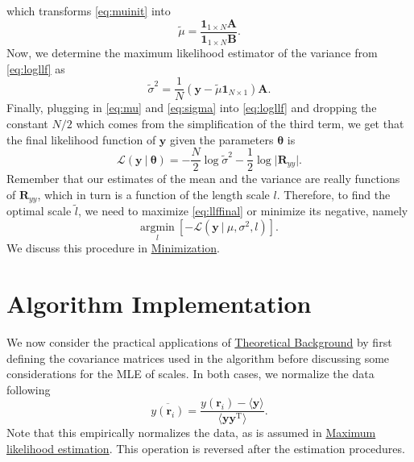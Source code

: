 \documentclass[12pt]{article}
\begin{document}
which transforms \eqref{eq:muinit} into
\begin{equation}
    \tilde{\mu} = \frac{\bm{1}_{1\times N}\bm{A}}{\bm{1}_{1\times N}\bm{B}}.
    \label{eq:mu}
\end{equation}
Now, we determine the maximum likelihood estimator of the variance from \eqref{eq:logllf} as
\begin{equation}
    \tilde{\sigma}^{2} = \frac{1}{N}(\bm{y} - \tilde{\mu}\bm{1}_{N\times 1})\bm{A}. 
    \label{eq:sigma}
\end{equation}
Finally, plugging in \eqref{eq:mu} and \eqref{eq:sigma} into \eqref{eq:logllf} and dropping the constant $N/2$ which comes from the simplification of the third term, we get that the final likelihood function of $\bm{y}$ given the parameters $\bm{\theta}$ is 
\begin{equation}
    \mathcal{L}(\bm{y} \: \lvert \: \bm{\theta}) = -\frac{N}{2}\log\tilde{\sigma}^{2} - \frac{1}{2}\log\lvert\bm{R}_{yy}\rvert.
    \label{eq:llffinal}
\end{equation}
Remember that our estimates of the mean and the variance are really functions of $\bm{R}_{yy}$, which in turn is a function of the length scale $l$. 
Therefore, to find the optimal scale $\tilde{l}$, we need to maximize \eqref{eq:llffinal} or minimize its negative, namely
\begin{equation}
	\underset{l}{\textrm{argmin}}\:\left[- \mathcal{L}\left(\bm{y} \: \lvert \: \mu, \sigma^{2}, l\right)\right].
	\label{eq:llf_min}
\end{equation}
We discuss this procedure in \hyperref[sec:minimization]{Minimization}.

\section*{Algorithm Implementation}

We now consider the practical applications of \hyperref[sec:theory]{Theoretical Background} by first defining the covariance matrices used in the algorithm before discussing some considerations for the MLE of scales.
In both cases, we normalize the data following
\begin{equation}
	\overline{y\left(\bm{r}_i\right)} = \frac{y\left(\bm{r}_i\right) - \langle\bm{y}\rangle}{\langle \bm{y}\bm{y}^{\textrm{T}} \rangle}.
\end{equation}
Note that this empirically normalizes the data, as is assumed in \hyperref[sec:mle]{Maximum likelihood estimation}. 
This operation is reversed after the estimation procedures.
\end{document}

